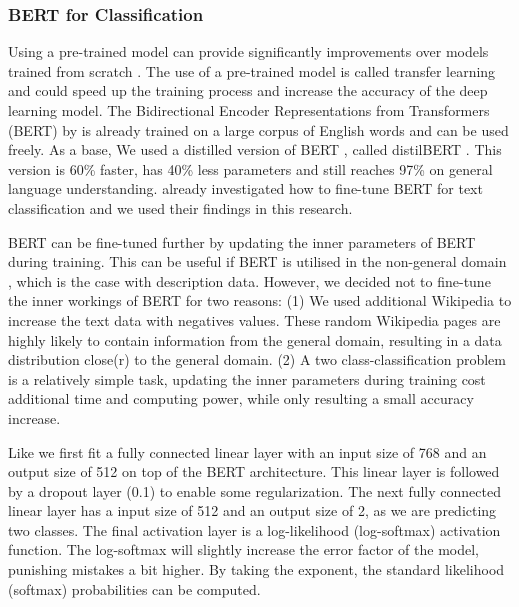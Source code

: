\documentclass[a4paper, 12pt, oneside]{book} %
\begin{document}
\subsubsection{BERT for Classification}
Using a pre-trained model can provide significantly improvements over models trained from scratch \autocite{mikolov_distributed_2013}.
The use of a pre-trained model is called transfer learning and could speed up the training process and increase the accuracy of the deep learning model.
The Bidirectional Encoder Representations from Transformers (BERT) by \textcite{devlin_bert_2019} is already trained on a large corpus of English words and can be used freely.
As a base, We used a distilled version of BERT \autocite{devlin_bert_2019}, called distilBERT \autocite{sanh_distilbert_2020}. 
This version is 60\% faster, has 40\% less parameters and still reaches 97\% on general language understanding.
\textcite{sun_how_2020} already investigated how to fine-tune BERT for text classification and we used their findings in this research.

BERT can be fine-tuned further by updating the inner parameters of BERT during training. 
This can be useful if BERT is utilised in the non-general domain \autocite{devlin_bert_2019, sun_how_2020, sanh_distilbert_2020}, which is the case with description data.
However, we decided not to fine-tune the inner workings of BERT for two reasons: 
(1) We used additional Wikipedia to increase the text data with negatives values.
These random Wikipedia pages are highly likely to contain information from the general
domain, resulting in a  data distribution close(r) to the general domain.
(2) A two class-classification problem is a relatively simple task, updating the inner parameters during training cost additional time and computing power, while only resulting a small accuracy increase.

Like \textcite{sun_how_2020} we first fit a fully connected linear layer with an input size of 768 and an output size of 512 on top of the BERT architecture. 
This linear layer is followed by a dropout layer (0.1) to enable some regularization.
The next fully connected linear layer has a input size of 512 and an output size of 2, as we are predicting two classes.
The final activation layer is a log-likelihood (log-softmax) activation function.
The log-softmax will slightly increase the error factor of the model, punishing mistakes a bit higher.
By taking the exponent, the standard likelihood (softmax) probabilities can be computed.
\end{document}
